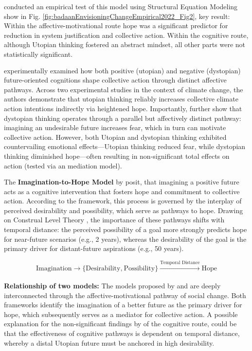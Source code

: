 \documentclass[jou,floatsintext]{apa7}
\begin{document}
\cite{badaanEnvisioningChangeEmpirical2022} conducted an empirical test of this model using Structural Equation Modeling show in Fig. \ref{fig:badaanEnvisioningChangeEmpirical2022_Fig2}, key result: Within the affective-motivational route hope was a significant predictor for reduction in system justification and collective action. Within the cognitive route, although Utopian thinking fostered an abstract mindset, all other parts were not statistically significant. 

\cite{dayshFutureWillBe2024} experimentally examined how both positive (utopian) and negative (dystopian) future-oriented cognitions shape collective action through distinct affective pathways. Across two experimental studies in the context of climate change, the authors demonstrate that utopian thinking reliably increases collective climate action intentions indirectly via heightened hope. Importantly, \cite{dayshFutureWillBe2024} further show that dystopian thinking operates through a parallel but affectively distinct pathway: imagining an undesirable future increases fear, which in turn can motivate collective action. However, both Utopian and dystopian thinking exhibited countervailing emotional effects---Utopian thinking reduced fear, while dystopian thinking diminished hope---often resulting in non-significant total effects on action (tested via an mediation model).




\vspace{0.5cm}

The \textbf{Imagination-to-Hope Model} by \cite{wenzelImaginingPositiveFuture2024} posit, that imagining a positive future acts as a cognitive intervention that fosters hope and commitment to collective action. According to the framework, this process is governed by the interplay of perceived desirability and possibility, which serve as pathways to hope. Drawing on Construal Level Theory \parencite{libermanRoleFeasibilityDesirability1998, tropeConstruallevelTheoryPsychological2010}, the importance of these pathways shifts with temporal distance: the perceived possibility of a goal more strongly predicts hope for near-future scenarios (e.g., 2 years), whereas the desirability of the goal is the primary driver for distant-future aspirations (e.g., 50 years). 


$$
\text{Imagination} \xrightarrow{}
\text{\{Desirability,} \
\text{Possibility\}}
\xrightarrow[]{\text{Temporal Distance}} \text{Hope} 
$$


\textbf{Relationship of two models:} The models proposed by \cite{badaanImaginingBetterSocieties2020} and \cite{wenzelImaginingPositiveFuture2024} are deeply interconnected through the affective-motivational pathway of social change. Both frameworks identify the imagination of a better future as the primary driver for hope, which subsequently serves as a mediator for collective action. A possible explanation for the non-significant findings by \cite{badaanEnvisioningChangeEmpirical2022} of the cognitive route, could be that the effectiveness of cognitive pathways is dependent on temporal distance, whereby a distal Utopian future must be anchored in high desirability.
\end{document}
